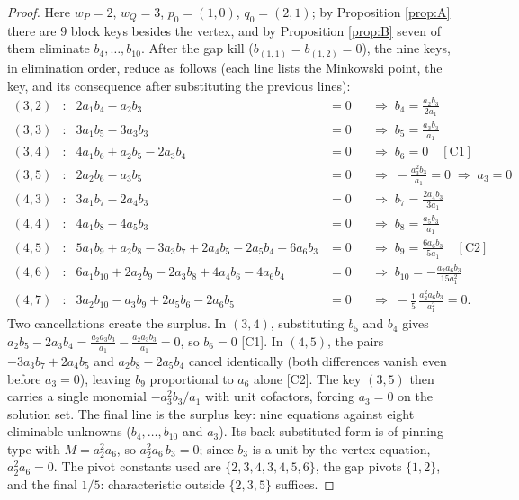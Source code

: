 \documentclass[11pt]{article}
\theoremstyle{definition}
\theoremstyle{remark}
\begin{document}
\begin{proof}
Here $w_P=2$, $w_Q=3$, $p_0=(1,0)$, $q_0=(2,1)$; by Proposition \ref{prop:A} there are $9$ block keys besides the vertex, and by Proposition \ref{prop:B} seven of them eliminate $b_4,\dots,b_{10}$. After the gap kill ($b_{(1,1)}=b_{(1,2)}=0$), the nine keys, in elimination order, reduce as follows (each line lists the Minkowski point, the key, and its consequence after substituting the previous lines):
\begin{align*}
(3,2)&: & 2a_1b_4-a_2b_3&=0 &&\Rightarrow\; b_4=\tfrac{a_2b_3}{2a_1}\\
(3,3)&: & 3a_1b_5-3a_3b_3&=0 &&\Rightarrow\; b_5=\tfrac{a_3b_3}{a_1}\\
(3,4)&: & 4a_1b_6+a_2b_5-2a_3b_4&=0 &&\Rightarrow\; b_6=0 \quad [\mathrm{C}1]\\
(3,5)&: & 2a_2b_6-a_3b_5&=0 &&\Rightarrow\; -\tfrac{a_3^2b_3}{a_1}=0 \;\Rightarrow\; a_3=0\\
(4,3)&: & 3a_1b_7-2a_4b_3&=0 &&\Rightarrow\; b_7=\tfrac{2a_4b_3}{3a_1}\\
(4,4)&: & 4a_1b_8-4a_5b_3&=0 &&\Rightarrow\; b_8=\tfrac{a_5b_3}{a_1}\\
(4,5)&: & 5a_1b_9+a_2b_8-3a_3b_7+2a_4b_5-2a_5b_4-6a_6b_3&=0 &&\Rightarrow\; b_9=\tfrac{6a_6b_3}{5a_1} \quad [\mathrm{C}2]\\
(4,6)&: & 6a_1b_{10}+2a_2b_9-2a_3b_8+4a_4b_6-4a_6b_4&=0 &&\Rightarrow\; b_{10}=-\tfrac{a_2a_6b_3}{15a_1^2}\\
(4,7)&: & 3a_2b_{10}-a_3b_9+2a_5b_6-2a_6b_5&=0 &&\Rightarrow\; -\tfrac{1}{5}\,\tfrac{a_2^2a_6b_3}{a_1^2}=0 .
\end{align*}
Two cancellations create the surplus. In $(3,4)$, substituting $b_5$ and $b_4$ gives $a_2b_5-2a_3b_4=\frac{a_2a_3b_3}{a_1}-\frac{a_2a_3b_3}{a_1}=0$, so $b_6=0$ [C1]. In $(4,5)$, the pairs $-3a_3b_7+2a_4b_5$ and $a_2b_8-2a_5b_4$ cancel identically (both differences vanish even before $a_3=0$), leaving $b_9$ proportional to $a_6$ alone [C2]. The key $(3,5)$ then carries a single monomial $-a_3^2b_3/a_1$ with unit cofactors, forcing $a_3=0$ on the solution set. The final line is the surplus key: nine equations against eight eliminable unknowns ($b_4,\dots,b_{10}$ and $a_3$). Its back-substituted form is of pinning type with $M=a_2^2a_6$, so $a_2^2a_6\,b_3=0$; since $b_3$ is a unit by the vertex equation, $a_2^2a_6=0$. The pivot constants used are $\{2,3,4,3,4,5,6\}$, the gap pivots $\{1,2\}$, and the final $1/5$: characteristic outside $\{2,3,5\}$ suffices.
\end{proof}
\end{document}
